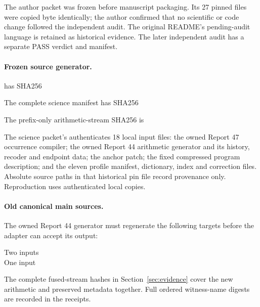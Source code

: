The author packet was frozen before manuscript packaging. Its 27 pinned files were copied byte identically; the author confirmed that no scientific or code change followed the independent audit. The original README's pending-audit language is retained as historical evidence. The later independent audit has a separate PASS verdict and manifest.

\paragraph{Frozen source generator.}
 has SHA256
\par{\small\noindent{}\par}
The complete science manifest has SHA256
\par{\small\noindent{}\par}
The prefix-only arithmetic-stream SHA256 is
\par{\small\noindent{}\par}
The science packet's  authenticates 18 local input files: the owned Report 47 occurrence compiler; the owned Report 44 arithmetic generator and its history, recoder and endpoint data; the anchor patch; the fixed compressed program description; and the eleven profile manifest, dictionary, index and correction files. Absolute source paths in that historical pin file record provenance only. Reproduction uses authenticated local copies.

\paragraph{Old canonical main sources.}
The owned Report 44 generator must regenerate the following targets before the adapter can accept its output:
\begin{description}
\item[Two inputs] 
\item[One input] 
\end{description}
The complete fused-stream hashes in Section~\ref{sec:evidence} cover the new arithmetic and preserved metadata together. Full ordered witness-name digests are recorded in the receipts.


